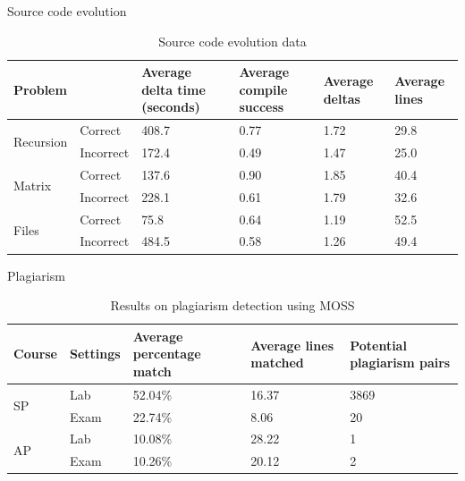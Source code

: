 \begin{frame}[shrink=10]{Source code evolution}
\begin{table}
\caption{Source code evolution data}
\begin{center}
\begin{tabular}{ |p{1.5cm}|l|p{2cm}|p{1.5cm}|p{1.5cm}|p{1.5cm}| }
\hline
 \textbf{Problem} & & \textbf{Average delta time (seconds)} & \textbf{Average
 compile success} & \textbf{Average deltas} & \textbf{Average lines} \\
\hline
\multirow{2}{*}{Recursion} 
& Correct & 408.7 & 0.77 & 1.72 & 29.8 \\
\cline{2-6}
& Incorrect & 172.4 & 0.49 & 1.47 & 25.0 \\
\hline
\multirow{2}{*}{Matrix}
& Correct & 137.6 & 0.90 & 1.85 & 40.4 \\
\cline{2-6}
& Incorrect & 228.1 & 0.61 & 1.79 & 32.6 \\
\hline
\multirow{2}{*}{Files}
 & Correct & 75.8 & 0.64 & 1.19 & 52.5 \\
 \cline{2-6}
 & Incorrect & 484.5 & 0.58 & 1.26 & 49.4 \\
\hline
\end{tabular}
\label{table:code_evolution}
\end{center}
\end{table}
\end{frame}

\begin{frame}{Plagiarism}
  \begin{table}[htb]
  \caption{Results on plagiarism detection using MOSS}
  \begin{center}
  \begin{tabular}{ |l|p{2cm}|p{2cm}|p{2cm}|p{2cm}| }
  \hline
  Course & Settings & Average percentage match & Average lines matched & Potential
  plagiarism pairs
  \\
  \hline 
  \multirow{2}{*}{SP} & Lab & 52.04\% & 16.37 & 3869 \\
   & Exam & 22.74\% & 8.06 & 20 \\
  \hline
  \multirow{2}{*}{AP} & Lab & 10.08\% & 28.22 & 1 \\
   & Exam  & 10.26\% & 20.12 & 2 \\
  \hline
  \end{tabular}
  \label{table:plagiarism_results}
  \end{center}
  \end{table}
\end{frame}

